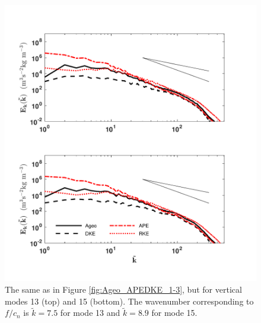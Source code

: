 \begin{figure}[H]
\includegraphics[scale=1]{Chapter4/img/Ageo_APEDKE_13-15}
\caption{The same as in Figure \ref{fig:Ageo_APEDKE_1-3}, but for vertical modes 13 (top) and 15 (bottom). The wavenumber corresponding to $f/c_n$ is $\tilde{k} = 7.5$ for mode 13 and $\tilde{k} = 8.9$ for mode 15.}
\label{fig:Ageo_APEDKE_13-15}
\end{figure}

